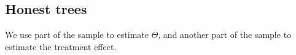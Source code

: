 
\subsection{Honest trees}

We use part of the sample to estimate \(\Theta \), and another part of the sample to estimate the treatment effect.

